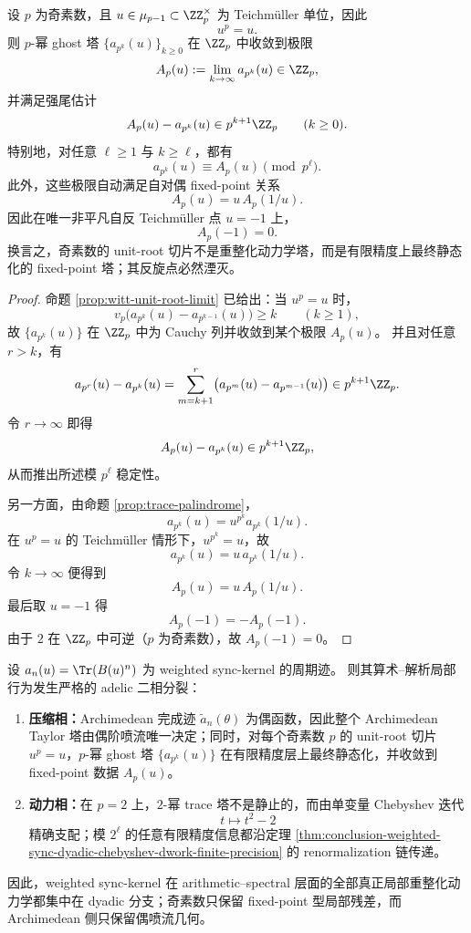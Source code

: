 \begin{theorem}\label{thm:conclusion-weighted-sync-oddprime-unitroot-staticization}
设 \(p\) 为奇素数，且 \(u\in\mu_{p-1}\subset\ZZ_p^\times\) 为 Teichm\"uller 单位，因此
\[
u^p=u.
\]
则 \(p\)-幂 ghost 塔 \(\{a_{p^k}(u)\}_{k\ge 0}\) 在 \(\ZZ_p\) 中收敛到极限
\[
A_p(u):=\lim_{k\to\infty}a_{p^k}(u)\in\ZZ_p,
\]
并满足强尾估计
\[
A_p(u)-a_{p^k}(u)\in p^{k+1}\ZZ_p
\qquad(k\ge 0).
\]
特别地，对任意 \(\ell\ge 1\) 与 \(k\ge \ell\)，都有
\[
a_{p^k}(u)\equiv A_p(u)\pmod{p^\ell}.
\]
此外，这些极限自动满足自对偶 fixed-point 关系
\[
A_p(u)=u\,A_p(1/u).
\]
因此在唯一非平凡自反 Teichm\"uller 点 \(u=-1\) 上，
\[
A_p(-1)=0.
\]
换言之，奇素数的 unit-root 切片不是重整化动力学塔，而是有限精度上最终静态化的 fixed-point 塔；其反旋点必然湮灭。
\end{theorem}

\begin{proof}
命题 \ref{prop:witt-unit-root-limit} 已给出：当 \(u^p=u\) 时，
\[
v_p\!\bigl(a_{p^k}(u)-a_{p^{k-1}}(u)\bigr)\ge k
\qquad(k\ge 1),
\]
故 \(\{a_{p^k}(u)\}\) 在 \(\ZZ_p\) 中为 Cauchy 列并收敛到某个极限 \(A_p(u)\)。
并且对任意 \(r>k\)，有
\[
a_{p^r}(u)-a_{p^k}(u)
=
\sum_{m=k+1}^{r}\bigl(a_{p^m}(u)-a_{p^{m-1}}(u)\bigr)\in p^{k+1}\ZZ_p.
\]
令 \(r\to\infty\) 即得
\[
A_p(u)-a_{p^k}(u)\in p^{k+1}\ZZ_p,
\]
从而推出所述模 \(p^\ell\) 稳定性。

另一方面，由命题 \ref{prop:trace-palindrome}，
\[
a_{p^k}(u)=u^{p^k}a_{p^k}(1/u).
\]
在 \(u^p=u\) 的 Teichm\"uller 情形下，\(u^{p^k}=u\)，故
\[
a_{p^k}(u)=u\,a_{p^k}(1/u).
\]
令 \(k\to\infty\) 便得到
\[
A_p(u)=u\,A_p(1/u).
\]
最后取 \(u=-1\) 得
\[
A_p(-1)=-A_p(-1).
\]
由于 \(2\) 在 \(\ZZ_p\) 中可逆（\(p\) 为奇素数），故 \(A_p(-1)=0\)。
\end{proof}

\begin{theorem}\label{thm:conclusion-weighted-sync-adelic-two-phase-splitting}
设 \(a_n(u)=\Tr(B(u)^n)\) 为 weighted sync-kernel 的周期迹。
则其算术--解析局部行为发生严格的 adelic 二相分裂：
\begin{enumerate}
  \item \textbf{压缩相：}Archimedean 完成迹 \(\widetilde a_n(\theta)\) 为偶函数，因此整个 Archimedean Taylor 塔由偶阶喷流唯一决定；同时，对每个奇素数 \(p\) 的 unit-root 切片 \(u^p=u\)，\(p\)-幂 ghost 塔 \(\{a_{p^k}(u)\}\) 在有限精度层上最终静态化，并收敛到 fixed-point 数据 \(A_p(u)\)。

  \item \textbf{动力相：}在 \(p=2\) 上，\(2\)-幂 trace 塔不是静止的，而由单变量 Chebyshev 迭代
  \[
  t\longmapsto t^2-2
  \]
  精确支配；模 \(2^\ell\) 的任意有限精度信息都沿定理 \ref{thm:conclusion-weighted-sync-dyadic-chebyshev-dwork-finite-precision} 的 renormalization 链传递。
\end{enumerate}
因此，weighted sync-kernel 在 arithmetic--spectral 层面的全部真正局部重整化动力学都集中在 dyadic 分支；奇素数只保留 fixed-point 型局部残差，而 Archimedean 侧只保留偶喷流几何。
\end{theorem}


